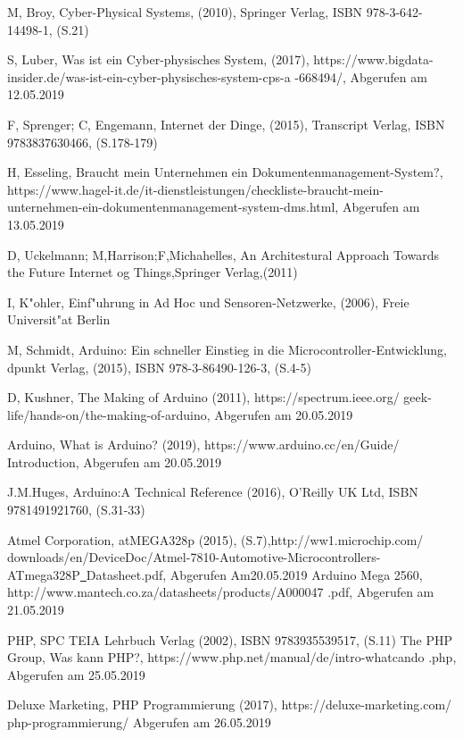 \begin{thebibliography}{99}
M, Broy, Cyber-Physical Systems, (2010), Springer Verlag, ISBN 978-3-642-14498-1, (S.21)

S, Luber, Was ist ein Cyber-physisches System, (2017), 
https://www.bigdata-insider.de/was-ist-ein-cyber-physisches-system-cps-a
-668494/, Abgerufen am 12.05.2019

F, Sprenger; C, Engemann, Internet der Dinge, (2015), Transcript Verlag,
ISBN 9783837630466, (S.178-179)

H, Esseling, Braucht mein Unternehmen ein Dokumentenmanagement-System?, 
https://www.hagel-it.de/it-dienstleistungen/checkliste-braucht-mein-
unternehmen-ein-dokumentenmanagement-system-dms.html, Abgerufen am 13.05.2019


D, Uckelmann; M,Harrison;F,Michahelles, An Architestural Approach Towards 
the Future Internet og Things,Springer Verlag,(2011)

I, K"ohler, Einf"uhrung in Ad Hoc und Sensoren-Netzwerke, (2006), Freie Universit"at Berlin

M, Schmidt, Arduino: Ein schneller Einstieg in die Microcontroller-Entwicklung, 
dpunkt Verlag, (2015), ISBN 978-3-86490-126-3, (S.4-5)

D, Kushner, The Making of Arduino (2011), https://spectrum.ieee.org/
geek-life/hands-on/the-making-of-arduino, Abgerufen am 20.05.2019

Arduino, What is Arduino? (2019), https://www.arduino.cc/en/Guide/
Introduction, Abgerufen am 20.05.2019

J.M.Huges, Arduino:A Technical Reference (2016), O’Reilly UK Ltd,
ISBN 9781491921760, (S.31-33)

Atmel Corporation, atMEGA328p (2015), (S.7),http://ww1.microchip.com/
downloads/en/DeviceDoc/Atmel-7810-Automotive-Microcontrollers-
ATmega328P\underline{\ }Datasheet.pdf, Abgerufen Am20.05.2019
Arduino Mega 2560, http://www.mantech.co.za/datasheets/products/A000047
.pdf, Abgerufen am 21.05.2019

PHP, SPC TEIA Lehrbuch Verlag (2002), ISBN 9783935539517, (S.11)
The PHP Group, Was kann PHP?, https://www.php.net/manual/de/intro-whatcando
.php, Abgerufen am 25.05.2019

Deluxe Marketing, PHP Programmierung (2017), https://deluxe-marketing.com/
php-programmierung/ Abgerufen am 26.05.2019


\end{thebibliography}
